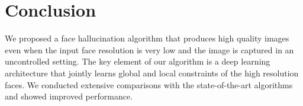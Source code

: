 \documentclass[runningheads]{llncs}
\begin{document}
\section{Conclusion} \label{sec:discuss}

We proposed a face hallucination algorithm that produces high quality images even when the input face resolution is very low and the image is captured in an uncontrolled setting. The key element of our algorithm is a deep learning architecture that jointly learns global and local constraints of the high resolution faces. We conducted extensive comparisons with the state-of-the-art algorithms and showed improved performance.






\end{document}
